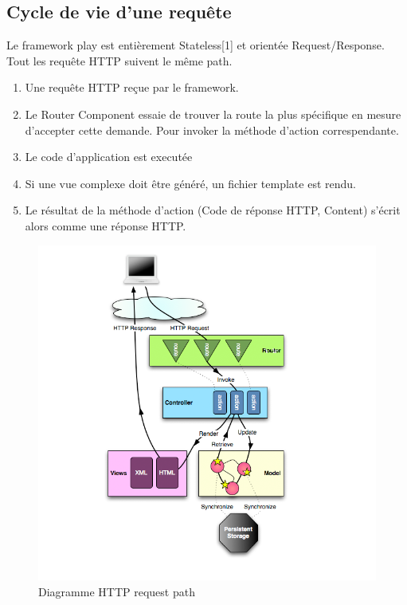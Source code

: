 \subsection{Cycle de vie d'une requête}
Le framework play est entièrement Stateless[1] et orientée Request/Response. Tout les requête HTTP suivent le même path.
\begin{enumerate}
\item Une requête HTTP reçue par le framework.
\item Le Router Component essaie de trouver la route la plus spécifique en mesure d'accepter cette demande. Pour invoker la méthode d'action correspendante. 
\item Le code d'application est executée
\item Si une vue complexe doit être généré, un fichier template est rendu.
\item Le résultat de la méthode d'action (Code de réponse HTTP, Content) s'écrit alors comme une réponse HTTP.
\end{enumerate}
\begin{figure}[H]
        \centering
                \centering
                \includegraphics[width=\textwidth]{diagrams_path.png}
                \caption{Diagramme HTTP request path}
                \label{fig:Diagramme HTTP request path}
       
\end{figure}
\newpage
